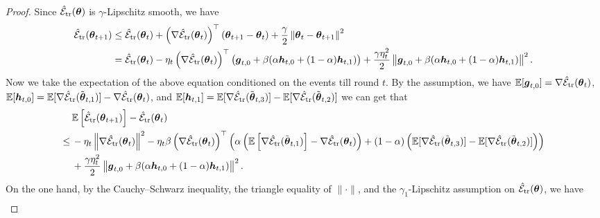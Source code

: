 \begin{proof}
    Since $\hat{\mathcal{E}}_{{\text{tr}}}(\boldsymbol{\theta})$ is $\gamma$-Lipschitz smooth, we have
    \begin{equation}
        \begin{aligned}
            \hat{\mathcal{E}}_{{\text{tr}}}(\boldsymbol{\theta}_{t+1}) & \le \hat{\mathcal{E}}_{{\text{tr}}}(\boldsymbol{\theta}_t) + \left(\nabla \hat{\mathcal{E}}_{{\text{tr}}}(\boldsymbol{\theta}_t)\right)^{\top} (\boldsymbol{\theta}_{t+1} - \boldsymbol{\theta}_t) + \frac{\gamma}{2}\left\|\boldsymbol{\theta}_t - \boldsymbol{\theta}_{t+1}\right\|^2 \\
            & = \hat{\mathcal{E}}_{{\text{tr}}}(\boldsymbol{\theta}_t) - \eta_t \left(\nabla \hat{\mathcal{E}}_{{\text{tr}}}(\boldsymbol{\theta}_t)\right)^{\top} \left(\boldsymbol{g}_{t,0} + \beta(\alpha \boldsymbol{h}_{t,0} + (1-\alpha)\boldsymbol{h}_{t,1})\right) + \frac{\gamma\eta_t^2}{2}\left\|\boldsymbol{g}_{t,0} + \beta(\alpha \boldsymbol{h}_{t,0} + (1-\alpha)\boldsymbol{h}_{t,1})\right\|^2.
        \end{aligned}
    \end{equation}
    Now we take the expectation of the above equation conditioned on the events till round $t$. By the assumption, we have $\mathbb{E}[\boldsymbol{g}_{t,0}] = \nabla \hat{\mathcal{E}}_{{\text{tr}}}(\boldsymbol{\theta}_t)$, $\mathbb{E}[\boldsymbol{h}_{t,0}] = \mathbb{E}[\nabla \hat{\mathcal{E}}_{{\text{tr}}}(\tilde{\boldsymbol{\theta}}_{t,1})] - \nabla \hat{\mathcal{E}}_{{\text{tr}}}(\boldsymbol{\theta}_t)$, and $\mathbb{E}[\boldsymbol{h}_{t,1}] = \mathbb{E}[\nabla \hat{\mathcal{E}}_{{\text{tr}}}(\tilde{\boldsymbol{\theta}}_{t,3})] - \mathbb{E}[\nabla \hat{\mathcal{E}}_{{\text{tr}}}(\tilde{\boldsymbol{\theta}}_{t,2})]$ we can get that
    \begin{equation} \label{eq:proof-gradient-1}
        \begin{aligned}
            & \, \mathbb{E}\left[\hat{\mathcal{E}}_{{\text{tr}}}(\boldsymbol{\theta}_{t+1})\right] - \hat{\mathcal{E}}_{{\text{tr}}}(\boldsymbol{\theta}_t) \\
            \le & \,  - \eta_t \left\|\nabla \hat{\mathcal{E}}_{{\text{tr}}}(\boldsymbol{\theta}_t)\right\|^2 - \eta_t\beta \left(\nabla \hat{\mathcal{E}}_{{\text{tr}}}(\boldsymbol{\theta}_t)\right)^{\top} \left(\alpha\left(\mathbb{E}\left[\nabla \hat{\mathcal{E}}_{{\text{tr}}}(\tilde{\boldsymbol{\theta}}_{t,1})\right] - \nabla \hat{\mathcal{E}}_{{\text{tr}}}(\boldsymbol{\theta}_t)\right) + (1-\alpha)\left(\mathbb{E}[\nabla \hat{\mathcal{E}}_{{\text{tr}}}(\tilde{\boldsymbol{\theta}}_{t,3})] - \mathbb{E}[\nabla \hat{\mathcal{E}}_{{\text{tr}}}(\tilde{\boldsymbol{\theta}}_{t,2})]\right)\right) \\
            & \, + \frac{\gamma\eta_t^2}{2}\left\|\boldsymbol{g}_{t,0} + \beta(\alpha \boldsymbol{h}_{t,0} + (1-\alpha)\boldsymbol{h}_{t,1})\right\|^2.
        \end{aligned}
    \end{equation}
    On the one hand, by the Cauchy–Schwarz inequality, the triangle equality of $\|\cdot\|$, and the $\gamma_1$-Lipschitz assumption on $\hat{\mathcal{E}}_{{\text{tr}}}(\boldsymbol{\theta})$, we have
    \begin{equation} \label{eq:proof-gradient-2}
        \begin{aligned}

\end{aligned}
\end{equation}
\end{proof}
